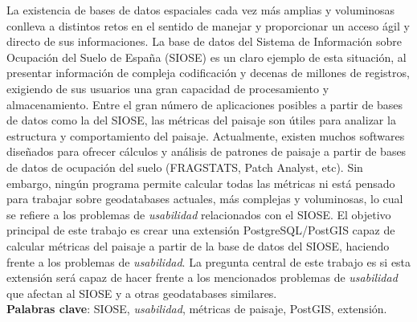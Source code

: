 
\begin{resumen}

La existencia de bases de datos espaciales cada vez más amplias y voluminosas conlleva a distintos retos en el sentido de manejar y proporcionar un acceso ágil y directo de sus informaciones. La base de datos del Sistema de Información sobre Ocupación del Suelo de España (SIOSE) es un claro ejemplo de esta situación, al presentar información de compleja codificación y decenas de millones de registros, exigiendo de sus usuarios una gran capacidad de procesamiento y almacenamiento. Entre el gran número de aplicaciones posibles a partir de bases de datos como la del SIOSE, las métricas del paisaje son útiles para analizar la estructura y comportamiento del paisaje. Actualmente, existen muchos softwares diseñados para ofrecer cálculos y análisis de patrones de paisaje a partir de bases de datos de ocupación del suelo (FRAGSTATS, Patch Analyst, etc). Sin embargo, ningún programa permite calcular todas las métricas ni está pensado para trabajar sobre geodatabases actuales, más complejas y voluminosas, lo cual se refiere a los problemas de \textit{usabilidad} relacionados con el SIOSE. El objetivo principal de este trabajo es crear una extensión PostgreSQL/PostGIS capaz de calcular métricas del paisaje a partir de la base de datos del SIOSE, haciendo frente a los problemas de \textit{usabilidad}. La pregunta central de este trabajo es si esta extensión será capaz de hacer frente a los mencionados problemas de \textit{usabilidad} que afectan al SIOSE y a otras geodatabases similares.\\


\textbf{Palabras clave}: SIOSE, \textit{usabilidad}, métricas de paisaje, PostGIS, extensión.


\end{resumen}
